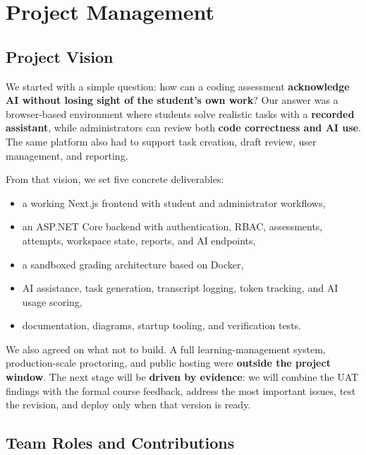 \documentclass[11pt,a4paper]{article}
\begin{document}
\section{Project Management}

\subsection{Project Vision}

We started with a simple question: how can a coding assessment \textbf{acknowledge AI without losing sight of the student's own work}? Our answer was a browser-based environment where students solve realistic tasks with a \textbf{recorded assistant}, while administrators can review both \textbf{code correctness and AI use}. The same platform also had to support task creation, draft review, user management, and reporting.

From that vision, we set five concrete deliverables:

\begin{itemize}
  \item a working Next.js frontend with student and administrator workflows,
  \item an ASP.NET Core backend with authentication, RBAC, assessments, attempts, workspace state, reports, and AI endpoints,
  \item a sandboxed grading architecture based on Docker,
  \item AI assistance, task generation, transcript logging, token tracking, and AI usage scoring,
  \item documentation, diagrams, startup tooling, and verification tests.
\end{itemize}

We also agreed on what not to build. A full learning-management system, production-scale proctoring, and public hosting were \textbf{outside the project window}. The next stage will be \textbf{driven by evidence}: we will combine the UAT findings with the formal course feedback, address the most important issues, test the revision, and deploy only when that version is ready.

\subsection{Team Roles and Contributions}
\end{document}
